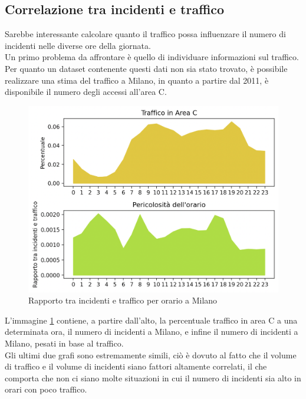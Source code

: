 \documentclass[a4paper]{report}
\begin{document}
\subsection{Correlazione tra incidenti e traffico}

Sarebbe interessante calcolare quanto il traffico possa influenzare il numero di incidenti 
nelle diverse ore della giornata. \\
Un primo problema da affrontare è quello di individuare informazioni sul traffico. 
Per quanto un dataset contenente questi dati non sia stato trovato, 
è possibile realizzare una stima del traffico a Milano, 
in quanto a partire dal 2011, è disponibile il numero degli accessi all'area C.

\begin{figure}
    \includegraphics[width=\linewidth]{../src/area_c/rapporto_incidenti_traffico.png}
    \caption{Rapporto tra incidenti e traffico per orario a Milano}
    \label{fig:rapporto-incidenti-traffico}
\end{figure}

L'immagine \ref{fig:rapporto-incidenti-traffico} contiene, a partire dall'alto, 
la percentuale traffico in area C a una determinata ora, il numero di incidenti a Milano, 
e infine il numero di incidenti a Milano, pesati in base al traffico.\\
Gli ultimi due grafi sono estremamente simili, ciò è dovuto al fatto che il volume di traffico e 
il volume di incidenti siano fattori altamente correlati, il che comporta che non ci siano molte 
situazioni in cui il numero di incidenti sia alto in orari con poco traffico.\\
\end{document}
